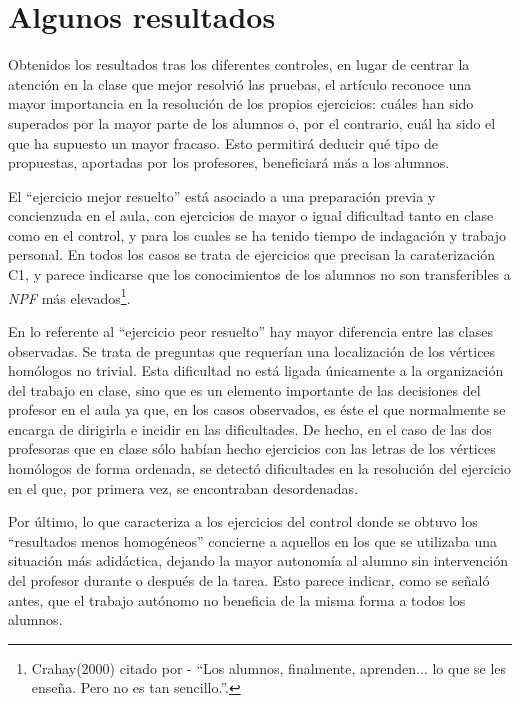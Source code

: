 \section*{Algunos resultados}

	Obtenidos los resultados tras los diferentes controles, en lugar de centrar la atención en la clase que mejor resolvió las pruebas, el artículo reconoce una mayor importancia en la resolución de los propios ejercicios: cuáles han sido superados por la mayor parte de los alumnos o, por el contrario, cuál ha sido el que ha supuesto un mayor fracaso. Esto permitirá deducir qué tipo de propuestas, aportadas por los profesores, beneficiará más a los alumnos. 
	
	El ``ejercicio mejor resuelto'' está asociado a una preparación previa y concienzuda en el aula, con ejercicios de mayor o igual dificultad tanto en clase como en el control, y para los cuales se ha tenido tiempo de indagación y trabajo personal. En todos los casos se trata de ejercicios que precisan la caraterización C1, y parece indicarse que los conocimientos de los alumnos no son transferibles a \textit{NPF} más elevados\footnote{Crahay(2000) citado por \citet{Horoks} - ``Los alumnos, finalmente, aprenden... lo que se les enseña. Pero no es tan sencillo.''.}.
	
	En lo referente al ``ejercicio peor resuelto'' hay mayor diferencia entre las clases observadas. Se trata de preguntas que requerían una localización de los vértices homólogos no trivial. Esta dificultad no está ligada únicamente a la organización del trabajo en clase, sino que es un elemento importante de las decisiones del profesor en el aula ya que, en los casos observados, es éste el que normalmente se encarga de dirigirla e incidir en las dificultades. De hecho, en el caso de las dos profesoras que en clase sólo habían hecho ejercicios con las letras de los vértices homólogos de forma ordenada, se detectó dificultades en la resolución del ejercicio en el que, por primera vez, se encontraban desordenadas. 
	
	Por último, lo que caracteriza a los ejercicios del control donde se obtuvo los ``resultados menos homogéneos'' concierne a aquellos en los que se utilizaba una situación más adidáctica, dejando la mayor autonomía al alumno sin intervención del profesor durante o después de la tarea. Esto parece indicar, como se señaló antes, que el trabajo autónomo no beneficia de la misma forma a todos los alumnos.
	
